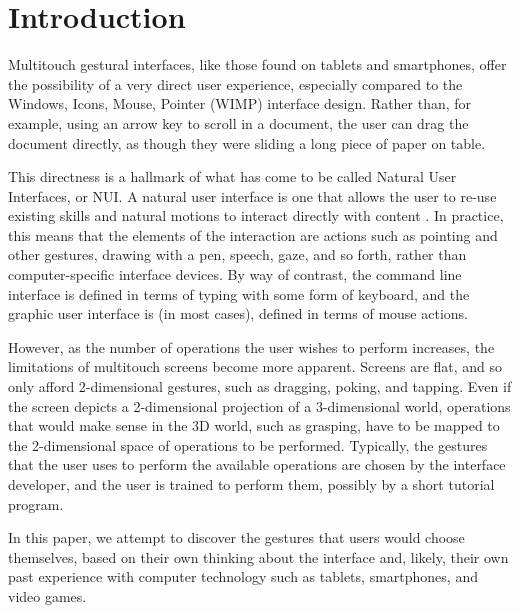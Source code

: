 \documentclass[]{article}
\title{}
\author{}
\begin{document}
\maketitle

\begin{abstract}

\end{abstract}

\section{Introduction}

Multitouch gestural interfaces, like those found on tablets and smartphones, offer the possibility of a very direct user experience, especially compared to the Windows, Icons, Mouse, Pointer (WIMP) interface design. 
Rather than, for example, using an arrow key to scroll in a document, the user can drag the document directly, as though they were sliding a long piece of paper on table. 

This directness is a hallmark of what has come to be called Natural User Interfaces, or NUI. 
A natural user interface is one that allows the user to re-use existing skills and natural motions to interact directly with content \cite{blakeNUIWin}. 
In practice, this means that the elements of the interaction are actions such as pointing and other gestures, drawing with a pen, speech, gaze, and so forth, rather than computer-specific interface devices. 
By way of contrast, the command line interface is defined in terms of typing with some form of keyboard, and the graphic user interface is (in most cases), defined in terms of mouse actions. 

However, as the number of operations the user wishes to perform increases, the limitations of multitouch screens become more apparent. 
Screens are flat, and so only afford 2-dimensional gestures, such as dragging, poking, and tapping. 
Even if the screen depicts a 2-dimensional projection of a 3-dimensional world, operations that would make sense in the 3D world, such as grasping, have to be mapped to the 2-dimensional space of operations to be performed. Typically,  the gestures that the user uses to perform the available operations are chosen by the interface developer, and the user is trained to perform them, possibly by a short tutorial program. 

In this paper, we attempt to discover the gestures that users would choose themselves, based on their own thinking about the interface and, likely, their own past experience with computer technology such as tablets, smartphones, and video games. 
\end{document}

